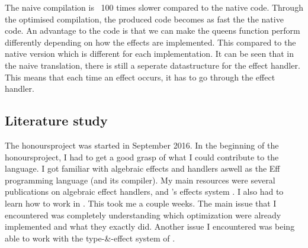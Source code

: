 The naive compilation is ~100 times slower compared to the native code. Through the optimised compilation, the produced code becomes as fast the the native code. An advantage to the \eff code is that we can make the queens function perform differently depending on how the effects are implemented. This compared to the native version which is different for each implementation. It can be seen that in the naive translation, there is still a seperate datastructure for the effect handler. This means that each time an effect occurs, it has to go through the effect handler. 

\subsection{Literature study}
The honoursproject was started in September 2016. In the beginning of the honoursproject, I had to get a good grasp of what I could contribute to the \eff language. I got familiar with algebraic effects and handlers aswell as the Eff programming language (and its compiler). My main resources were several publications on algebraic effect handlers, \eff and \eff's effects system \cite{introduction} \cite{effectsystem} \cite{inferring} \cite{handling} \cite{programming} \cite{monads}. I also had to learn how to work in \ocaml. This took me a couple weeks. The main issue that I encountered was completely understanding which optimization were already implemented and what they exactly did. Another issue I encountered was being able to work with the type-\&-effect system of \eff. 

